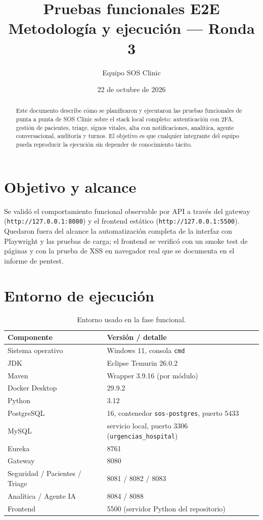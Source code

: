 \documentclass[11pt]{article}
\title{\textbf{Pruebas funcionales E2E}\\[0.3em]
\large Metodología y ejecución --- Ronda 3}
\author{Equipo SOS Clinic}
\date{22 de octubre de 2026}
\begin{document}
\maketitle

\begin{abstract}
Este documento describe cómo se planificaron y ejecutaron las pruebas
funcionales de punta a punta de SOS Clinic sobre el stack local completo:
autenticación con 2FA, gestión de pacientes, triage, signos vitales, alta con
notificaciones, analítica, agente conversacional, auditoría y turnos. El
objetivo es que cualquier integrante del equipo pueda reproducir la ejecución
sin depender de conocimiento tácito.
\end{abstract}

\tableofcontents

\section{Objetivo y alcance}

Se validó el comportamiento funcional observable por API a través del gateway
(\texttt{http://127.0.0.1:8080}) y el frontend estático
(\texttt{http://127.0.0.1:5500}). Quedaron fuera del alcance la automatización
completa de la interfaz con Playwright y las pruebas de carga; el frontend se
verificó con un smoke test de páginas y con la prueba de XSS en navegador real
que se documenta en el informe de pentest.

\section{Entorno de ejecución}

\begin{table}[h]
\centering
\small
\begin{tabular}{@{}ll@{}}
\toprule
Componente & Versión / detalle \\
\midrule
Sistema operativo & Windows 11, consola \texttt{cmd} \\
JDK & Eclipse Temurin 26.0.2 \\
Maven & Wrapper 3.9.16 (por módulo) \\
Docker Desktop & 29.9.2 \\
Python & 3.12 \\
PostgreSQL & 16, contenedor \texttt{sos-postgres}, puerto 5433 \\
MySQL & servicio local, puerto 3306 (\texttt{urgencias\_hospital}) \\
Eureka & 8761 \\
Gateway & 8080 \\
Seguridad / Pacientes / Triage & 8081 / 8082 / 8083 \\
Analítica / Agente IA & 8084 / 8088 \\
Frontend & 5500 (servidor Python del repositorio) \\
\bottomrule
\end{tabular}
\caption{Entorno usado en la fase funcional.}
\end{table}
\end{document}

